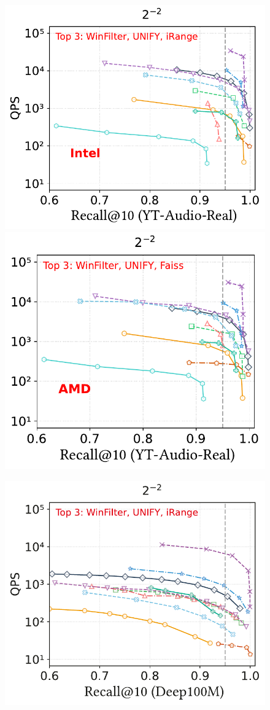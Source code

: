 \documentclass[sigconf, nonacm]{acmart}
\begin{document}
{\begin{figure}
\begin{minipage}[t]{0.38\textwidth}
	\end{minipage}%
	\hfill %
	\begin{minipage}[t]{0.39\textwidth}
		\centering
		\includegraphics[width=0.495\linewidth]{figures/exp/range_85.pdf}
		\hfill
		\includegraphics[width=0.47\linewidth]{figures/exp/range_71.pdf}

	\end{minipage}%
	\hfill
	\begin{minipage}[t]{0.203\textwidth}
		\centering
		\includegraphics[width=0.96\linewidth]{figures/exp/range_deep100M.pdf} 


\end{minipage}
\end{figure}}
\end{document}
